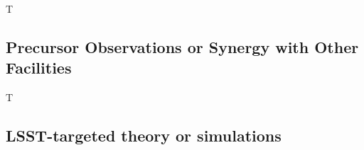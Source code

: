 \begin{tasklist}{T}
\begin{task}
\label{task:gal:XXX}
\motivation{}
\activities{}
\deliverables{}
\end{task}

\begin{task}
\label{task:gal:XXX}
\motivation{}
\activities{}
\deliverables{}
\end{task}

\end{tasklist}

\subsection{Precursor Observations or Synergy with Other Facilities} \label{sec:tasks:gal:precursor}

\begin{tasklist}{T}
\begin{task}
\label{task:gal:XXX}
\motivation{}
\activities{}
\deliverables{}
\end{task}

\begin{task}
\label{task:gal:XXX}
\motivation{}
\activities{}
\deliverables{}
\end{task}

\begin{task}
\label{task:gal:XXX}
\motivation{}
\activities{}
\deliverables{}
\end{task}

\begin{task}
\label{task:gal:XXX}
\motivation{}
\activities{}
\deliverables{}
\end{task}

\begin{task}
\label{task:gal:XXX}
\motivation{}
\activities{}
\deliverables{}
\end{task}

\end{tasklist}

\subsection{LSST-targeted theory or simulations} \label{sec:tasks:gal:simulations}

